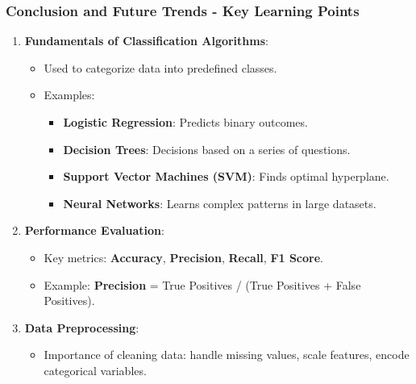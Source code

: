 \documentclass{beamer}
\begin{document}
\begin{frame}[fragile]
    \frametitle{Conclusion and Future Trends - Key Learning Points}
    
    \begin{enumerate}
        \item \textbf{Fundamentals of Classification Algorithms}:
            \begin{itemize}
                \item Used to categorize data into predefined classes.
                \item Examples:
                    \begin{itemize}
                        \item \textbf{Logistic Regression}: Predicts binary outcomes.
                        \item \textbf{Decision Trees}: Decisions based on a series of questions.
                        \item \textbf{Support Vector Machines (SVM)}: Finds optimal hyperplane.
                        \item \textbf{Neural Networks}: Learns complex patterns in large datasets.
                    \end{itemize}
            \end{itemize}
        
        \item \textbf{Performance Evaluation}:
            \begin{itemize}
                \item Key metrics: \textbf{Accuracy}, \textbf{Precision}, \textbf{Recall}, \textbf{F1 Score}.
                \item Example: \textbf{Precision} = True Positives / (True Positives + False Positives).
            \end{itemize}
        
        \item \textbf{Data Preprocessing}:
            \begin{itemize}
                \item Importance of cleaning data: handle missing values, scale features, encode categorical variables.
            \end{itemize}
    \end{enumerate}
\end{frame}
\end{document}
